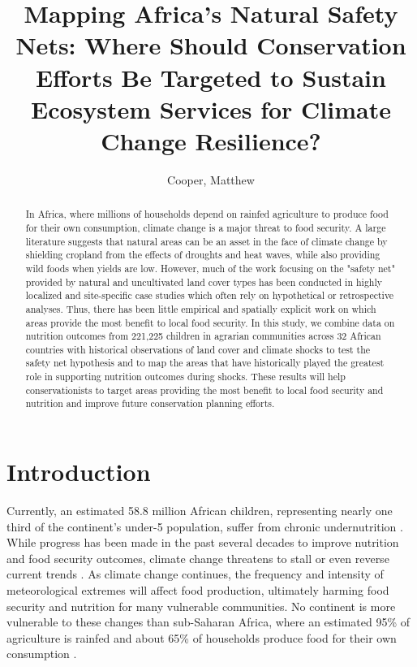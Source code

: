 \documentclass{article}
\begin{document}
\title{Mapping Africa's Natural Safety Nets: Where Should Conservation Efforts Be Targeted to Sustain Ecosystem Services for Climate Change Resilience?}

\author{
	Cooper, Matthew\\
}


\maketitle
\begin{abstract}

In Africa, where millions of households depend on rainfed agriculture to produce food for their own consumption, climate change is a major threat to food security.  A large literature suggests that natural areas can be an asset in the face of climate change by shielding cropland from the effects of droughts and heat waves, while also providing wild foods when yields are low.  However, much of the work focusing on the "safety net" provided by natural and uncultivated land cover types has been conducted in highly localized and site-specific case studies which often rely on hypothetical or retrospective analyses.  Thus, there has been little empirical and spatially explicit work on which areas provide the most benefit to local food security.  In this study, we combine data on nutrition outcomes from 221,225 children in agrarian communities across 32 African countries with historical observations of land cover and climate shocks to test the safety net hypothesis and to map the areas that have historically played the greatest role in supporting nutrition outcomes during shocks.  These results will help conservationists to target areas providing the most benefit to local food security and nutrition and improve future conservation planning efforts.

\end{abstract}

\section{Introduction}

Currently, an estimated 58.8 million African children, representing nearly one third of the continent's under-5 population, suffer from chronic undernutrition \cite{unicef2019}.  While progress has been made in the past several decades to improve nutrition and food security outcomes, climate change threatens to stall or even reverse current trends \cite{FAO2018}.  As climate change continues, the frequency and intensity of meteorological extremes will affect food production, ultimately harming food security and nutrition for many vulnerable communities.  No continent is more vulnerable to these changes than sub-Saharan Africa, where an estimated 95\% of agriculture is rainfed \cite{Wani2009} and about 65\% of households  produce food for their own consumption \cite{Runge2004}.
\end{document}
